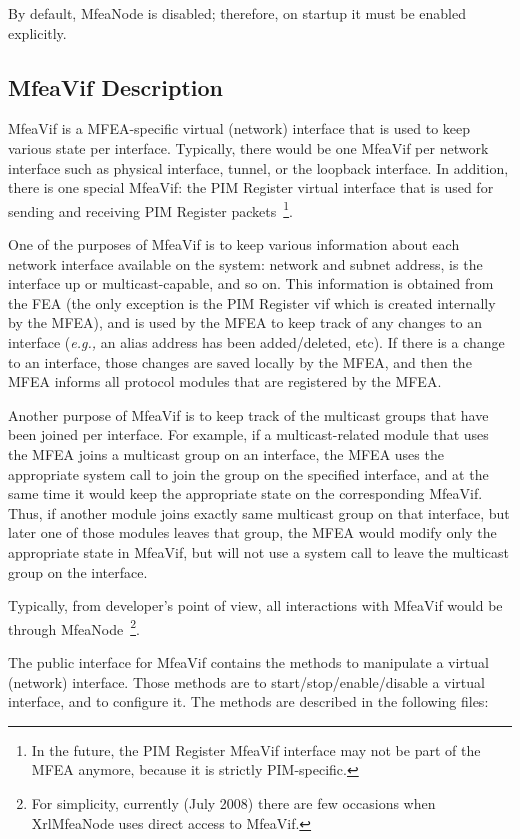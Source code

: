 \documentclass[11pt]{article}
\newcommand{\eg}{\emph{e.g.,}\xspace}
\begin{document}
By default, MfeaNode is disabled; therefore, on startup it must be
enabled explicitly.

\subsection{MfeaVif Description}

MfeaVif is a MFEA-specific virtual (network) interface that is used to keep
various state per interface. Typically, there would be one
MfeaVif per network interface such as physical
interface, tunnel, or the loopback interface. In addition, there is
one special MfeaVif: the PIM Register virtual
interface that is used for sending and receiving PIM Register
packets~\footnote{In the future, the PIM
Register MfeaVif interface may not be part of the MFEA anymore, because
it is strictly PIM-specific.}.

One of the purposes of MfeaVif is to keep various information about each
network interface available on the system: network and subnet address,
is the interface up or multicast-capable, and so on. This information is
obtained from the FEA (the only exception is the PIM Register vif which
is created internally by the MFEA), and is used by the MFEA to keep
track of any changes to an interface (\eg an alias address has been
added/deleted, etc). If there is a change to an interface, those changes
are saved locally by the MFEA, and then the MFEA informs all protocol
modules that are registered by the MFEA.

Another purpose of MfeaVif is to keep track of the multicast groups that
have been joined per interface. For example, if a multicast-related
module that uses the MFEA joins a multicast group on an interface, the
MFEA uses the appropriate system call to join the group on the
specified interface, and at the same time it would keep the appropriate
state on the corresponding MfeaVif. Thus, if another module joins
exactly same multicast group on that interface, but later one of
those modules leaves that group, the MFEA would modify only the appropriate
state in MfeaVif, but will not use a system call to leave the multicast
group on the interface.

Typically, from developer's point of view, all interactions with MfeaVif
would be through MfeaNode~\footnote{For simplicity, currently
(July 2008) there are few occasions when XrlMfeaNode uses direct access to
MfeaVif.}.

The public interface for MfeaVif contains the methods to manipulate a
virtual (network) interface. Those methods are to start/stop/enable/disable a
virtual interface, and to configure it. The methods are described in
the following files:
\end{document}
